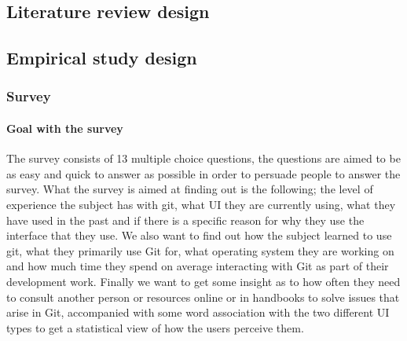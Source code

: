 \documentclass[12pt,a4paper,article,compsoc]{IEEEtran}
\begin{document}
			\subsection{Literature review design}
			
			\subsection{Empirical study design}
			
				\subsubsection{Survey}
					\paragraph*{Goal with the survey}
					The survey consists of 13 multiple choice questions, the questions are aimed to be as easy and quick to answer as possible in order to persuade people to answer the survey. What the survey is aimed at finding out is the following; the level of experience the subject has with git, what UI they are currently using, what they have used in the past and if there is a specific reason for why they use the interface that they use. We also want to find out how the subject learned to use git, what they primarily use Git for, what operating system they are working on and how much time they spend on average interacting with Git as part of their development work. Finally we want to get some insight as to how often they need to consult another person or resources online or in handbooks to solve issues that arise in Git, accompanied with some word association with the two different UI types to get a statistical view of how the users perceive them.
					
\end{document}
